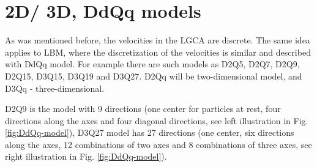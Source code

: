 
\section{2D/ 3D, DdQq models}

As was mentioned before, the velocities in the LGCA are discrete. The same idea applies to LBM, where the discretization of the velocities is similar and described with DdQq model. For example there are  such models as D2Q5, D2Q7, D2Q9, D2Q15, D3Q15, D3Q19 and D3Q27. D2Qq will be two-dimensional model, and D3Qq - three-dimensional.

D2Q9 is the model with 9 directions (one center for particles at rest, four directions along the axes and four diagonal directions, see left illustration in Fig. \ref{fig:DdQq-model}), D3Q27 model has 27 directions (one center, six directions along the axes, 12 combinations of two axes and 8 combinations of three axes, see right illustration in Fig. \ref{fig:DdQq-model}).

